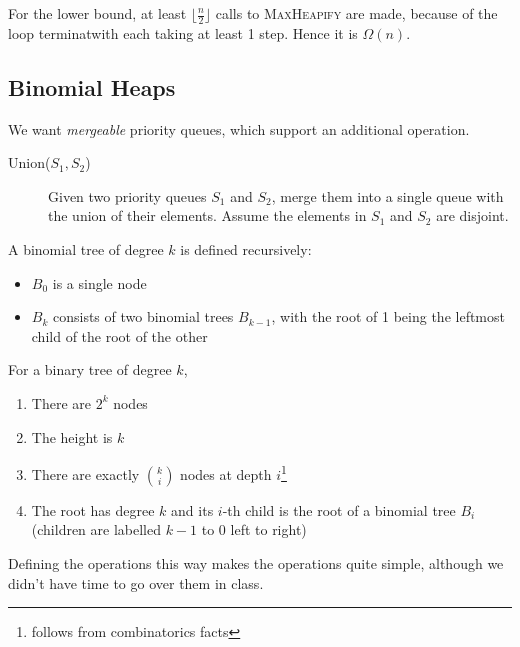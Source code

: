 For the lower bound, at least $\lfloor \frac{n}{2} \rfloor$ calls to \textsc{MaxHeapify} are made, because of the loop terminatwith each taking at least 1 step. Hence it is $\Omega(n)$.

\subsection{Binomial Heaps}

We want \textit{mergeable} priority queues, which support an additional operation.
\begin{description}
    \item[Union($S_1, S_2$)] Given two priority queues $S_1$ and $S_2$, merge them into a single queue with the union of their elements. Assume the elements in $S_1$ and $S_2$ are disjoint. 
\end{description}

\begin{definition}
A binomial tree of degree $k$ is defined recursively:
\begin{itemize} 
\item $B_0$ is a single node 
    \item $B_k$ consists of two binomial trees $B_{k-1}$, with the root of 1 being the leftmost child of the root of the other 
\end{itemize}
\end{definition}

\noindent For a binary tree of degree $k$,
\begin{enumerate}
\item There are $2^k$ nodes
\item The height is $k$
    \item There are exactly $\binom{k}{i}$ nodes at depth $i$\footnote{follows from combinatorics facts}
    \item The root has degree $k$ and its $i$-th child is the root of a binomial tree $B_i$ (children are labelled $k-1$ to 0 left to right) 
\end{enumerate}

Defining the operations this way makes the operations quite simple, although we didn't have time to go over them in class.
